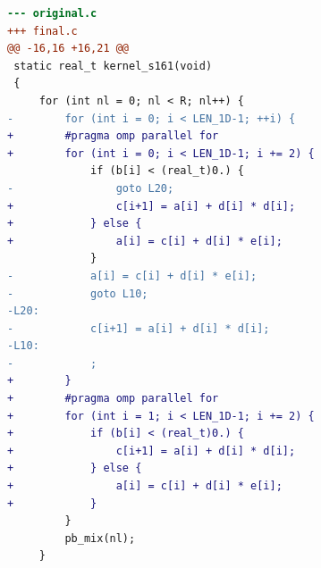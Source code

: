 \begin{lstlisting}[language=diff,basicstyle=\ttfamily\scriptsize,breaklines=true,caption={tsvc_b1/s161 — BROKEN (e2b1_a_1)}]
--- original.c
+++ final.c
@@ -16,16 +16,21 @@
 static real_t kernel_s161(void)
 {
     for (int nl = 0; nl < R; nl++) {
-        for (int i = 0; i < LEN_1D-1; ++i) {
+        #pragma omp parallel for 
+        for (int i = 0; i < LEN_1D-1; i += 2) {
             if (b[i] < (real_t)0.) {
-                goto L20;
+                c[i+1] = a[i] + d[i] * d[i];
+            } else {
+                a[i] = c[i] + d[i] * e[i];
             }
-            a[i] = c[i] + d[i] * e[i];
-            goto L10;
-L20:
-            c[i+1] = a[i] + d[i] * d[i];
-L10:
-            ;
+        }
+        #pragma omp parallel for 
+        for (int i = 1; i < LEN_1D-1; i += 2) {
+            if (b[i] < (real_t)0.) {
+                c[i+1] = a[i] + d[i] * d[i];
+            } else {
+                a[i] = c[i] + d[i] * e[i];
+            }
         }
         pb_mix(nl);
     }
\end{lstlisting}
